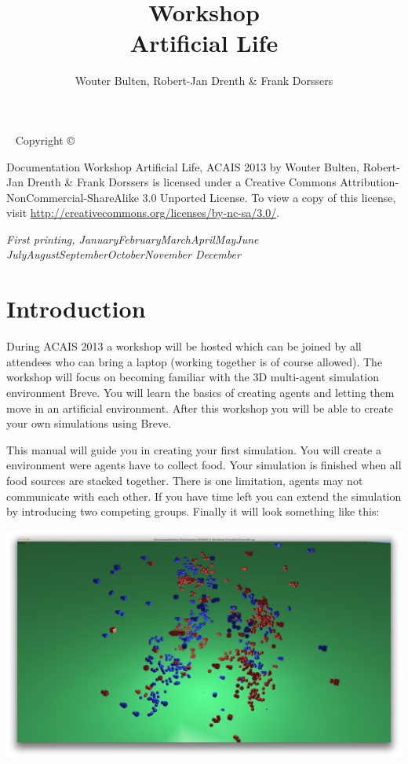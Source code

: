 \documentclass[a4paper,twoside,justified]{tufte-book}
\title[Workshop Artificial Life]{Workshop\\ Artificial Life}
\author[Wouter Bulten, Robert-Jan Drenth, Frank Dorssers]{Wouter Bulten, Robert-Jan Drenth \& Frank Dorssers}
\newcommand{\monthyear}{%
  \ifcase\month\or January\or February\or March\or April\or May\or June\or
  July\or August\or September\or October\or November\or
  December\fi\space\number\year
}
\begin{document}
\maketitle


\newpage
\begin{fullwidth}
~\vfill
\thispagestyle{empty}
\setlength{\parindent}{0pt}
\setlength{\parskip}{\baselineskip}
Copyright \copyright\ \the\year\ \thanklessauthor

\par{}


\par Documentation Workshop Artificial Life, ACAIS 2013 by Wouter Bulten, Robert-Jan Drenth \& Frank Dorssers is licensed under a Creative Commons Attribution-NonCommercial-ShareAlike 3.0 Unported License. To view a copy of this license, visit \url{http://creativecommons.org/licenses/by-nc-sa/3.0/}.

\par\textit{First printing, \monthyear}
\end{fullwidth}

\tableofcontents
\setlength\parindent{0pt}
\chapter*{Introduction}

During ACAIS 2013 a workshop will be hosted which can be joined by all attendees who can bring a laptop (working together is of course allowed). The workshop will focus on becoming familiar with the 3D multi-agent simulation environment Breve. You will learn the basics of creating agents and letting them move in an artificial environment. After this workshop you will be able to create your own simulations using Breve.

This manual will guide you in creating your first simulation. You will create a environment were agents have to collect food. Your simulation is finished when all food sources are stacked together. There is one limitation, agents may not communicate with each other. If you have time left you can extend the simulation by introducing two competing groups. Finally it will look something like this:

\includegraphics{endproduct}
\end{document}
